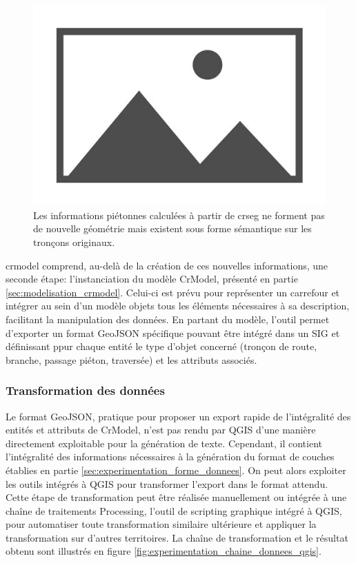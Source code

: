 \begin{figure}
    \centering
    \includegraphics{images/placeholder.jpg}
    \caption{Les informations piétonnes calculées à partir de crseg ne forment pas de nouvelle géométrie mais existent sous forme sémantique sur les tronçons originaux.}
    \label{fig:experimentation_crmodel_info_pietonne}
\end{figure}

\newpar{}

crmodel comprend, au-delà de la création de ces nouvelles informations, une seconde étape: l'instanciation du modèle CrModel, présenté en partie \ref{sec:modelisation_crmodel}. Celui-ci est prévu pour représenter un carrefour et intégrer au sein d'un modèle objets tous les éléments nécessaires à sa description, facilitant la manipulation des données. En partant du modèle, l'outil permet d'exporter un format GeoJSON spécifique pouvant être intégré dans un SIG et définissant ppur chaque entité le type d'objet concerné (tronçon de route, branche, passage piéton, traversée) et les attributs associés.

\subsubsection{Transformation des données}

Le format GeoJSON, pratique pour proposer un export rapide de l'intégralité des entités et attributs de CrModel, n'est pas rendu par QGIS d'une manière directement exploitable pour la génération de texte. Cependant, il contient l'intégralité des informations nécessaires à la génération du format de couches établies en partie \ref{sec:experimentation_forme_donnees}. On peut alors exploiter les outils intégrés à QGIS pour transformer l'export dans le format attendu. Cette étape de transformation peut être réalisée manuellement ou intégrée à une chaîne de traitements Processing, l'outil de scripting graphique intégré à QGIS, pour automatiser toute transformation similaire ultérieure et appliquer la transformation sur d'autres territoires. La chaîne de transformation et le résultat obtenu sont illustrés en figure \ref{fig:experimentation_chaine_donnees_qgis}.

